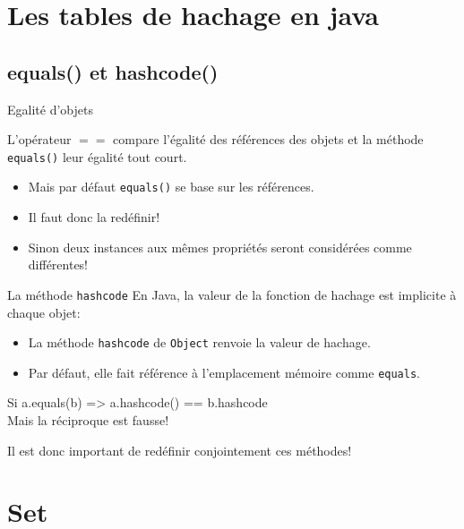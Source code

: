 \documentclass[12pt,a4paper]{beamer}
\newcommand{\hl}[1]{\textcolor{blueemph}{#1}}
\begin{document}
\section{Les tables de hachage en java}

\subsection{equals() et hashcode()}

\begin{frame}{Egalité d'objets}
\begin{block}{}
L'opérateur $==$ compare l'égalité des références des objets et la méthode \texttt{equals()} leur égalité tout court.
\end{block}

\begin{itemize}
\item Mais par défaut \texttt{equals()} se base sur les références.
\item Il faut donc la \hl{redéfinir}!
\item Sinon deux instances aux mêmes propriétés seront considérées comme différentes!
\end{itemize}
\end{frame}

\begin{frame}{La méthode \texttt{hashcode}}
En Java, la valeur de la fonction de hachage est implicite à chaque objet:
\begin{itemize}
\item La méthode \texttt{hashcode} de \texttt{Object} renvoie la valeur de hachage.
\item Par défaut, elle fait référence à l'emplacement mémoire comme \texttt{equals}.
\end{itemize}
\begin{block}{}
Si a.equals(b) => a.hashcode() == b.hashcode\\
Mais la réciproque est fausse!
\end{block}
\pause
Il est donc important de redéfinir conjointement ces méthodes!
\end{frame}



\section{Set}

\begin{frame}
\tableofcontents
\end{frame}
\end{document}
